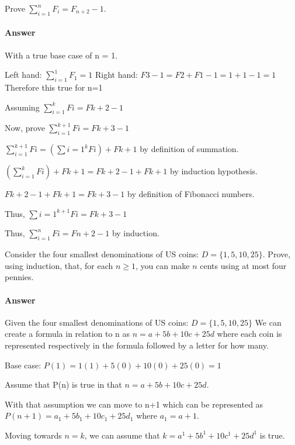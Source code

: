 \documentclass{article}
\begin{document}
{Prove $\sum_{i=1}^n F_i = F_{n+2}-1$.

\paragraph{Answer}

With a true base case of n = 1.

Left hand: $\sum_{i=1}^1 F_1 = 1$
Right hand: $F{3}-1 = F{2}+F{1}-1 = 1+1-1 = 1$
Therefore this true for n=1

Assuming $\sum_{i=1}^k Fi = F{k+2}-1$

Now, prove $\sum_{i=1}^{k+1} Fi = F{k+3}-1$

$\sum_{i=1}^{k+1} Fi = (\sum{i=1}^k Fi) + F{k+1}$ by definition of summation.

$(\sum_{i=1}^k Fi) + F{k+1} = F{k+2}-1 + F{k+1}$ by induction hypothesis.

$F{k+2}-1 + F{k+1} = F{k+3}-1$ by definition of Fibonacci numbers.

Thus, $\sum{i=1}^{k+1} Fi = F{k+3}-1$

Thus, $\sum_{i=1}^n Fi = F{n+2}-1$ by induction.

 

Consider the four smallest denominations of US coins: $D=\{1,5,10,25\}$.  Prove, using
induction, that, for each $n \geq 1$, you can make $n$ cents using at most four
pennies.

\paragraph{Answer}

Given the four smallest denominations of US coins: $D=\{1,5,10,25\}$ We can create
a formula in relation to n as $n = a+5b+10c+25d$ where each coin is represented respectively
in the formula followed by a letter for how many.

Base case: $P(1) = 1(1)+5(0)+10(0)+25(0) = 1$

Assume that P(n) is true in that $n = a+5b+10c+25d$.

With that assumption we can move to n+1 which can be represented as
$P(n+1) = a_1+5b_1+10c_1+25d_1$ where $a_1=a+1$.

Moving towards $n=k$, we can assume that $k = a^1+5b^1+10c^1+25d^1$ is true.

}
\end{document}
